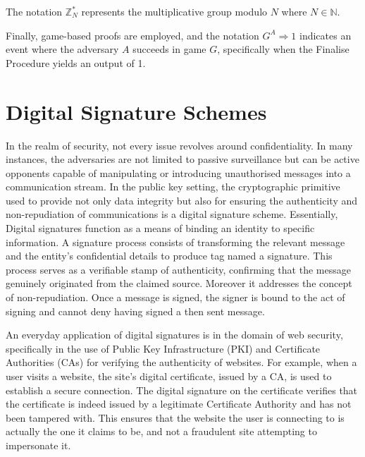 \documentclass[]{final_report}
\theoremstyle{definition}
\begin{document}
The notation \( \mathbb{Z}_N^* \) represents the multiplicative group modulo \( N \) where \( N \in \mathbb{N} \). 

Finally, game-based proofs are employed, and the notation \( G^A \Rightarrow 1 \) indicates an event where the adversary \( A \) succeeds in game \( G \), specifically when the Finalise Procedure yields an output of 1.


\section{Digital Signature Schemes}
In the realm of security, not every issue revolves around confidentiality. In many instances, the adversaries are not limited to passive surveillance but can be active opponents capable of manipulating or introducing unauthorised messages into a communication stream. In the public key setting, the cryptographic primitive used to provide not only data integrity but also for ensuring the authenticity and non-repudiation of communications is a digital signature scheme. 
Essentially, Digital signatures function as a means of binding an identity to specific information. A signature process consists of transforming the relevant message and the entity’s confidential details to produce tag named a signature. This process serves as a verifiable stamp of authenticity, confirming that the message genuinely originated from the claimed source. Moreover it addresses the concept of non-repudiation. Once a message is signed, the signer is bound to the act of signing and cannot deny having signed a then sent message.

An everyday application of digital signatures is in the domain of web security, specifically in the use of Public Key Infrastructure (PKI) and Certificate Authorities (CAs) for verifying the authenticity of websites. For example, when a user visits a website, the site's digital certificate, issued by a CA, is used to establish a secure connection. The digital signature on the certificate verifies that the certificate is indeed issued by a legitimate Certificate Authority and has not been tampered with. This ensures that the website the user is connecting to is actually the one it claims to be, and not a fraudulent site attempting to impersonate it. 
\end{document}
